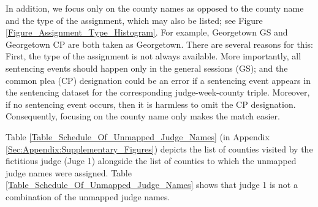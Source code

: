 \documentclass[11pt]{article}
\theoremstyle{ModifiedStyle}
\begin{document}
  	In addition, we focus only on the county names as opposed to the county name and the type of the assignment, which may also be listed; see Figure \ref{Figure_Assignment_Type_Histogram}. For example, Georgetown GS and Georgetown CP are both taken as Georgetown. There are several reasons for this: First, the type of the assignment is not always available. More importantly, all sentencing events should happen only in the general sessions (GS); and the common plea (CP) designation could be an error if a sentencing event appears in the sentencing dataset for the corresponding judge-week-county triple. Moreover, if no sentencing event occurs, then it is harmless to omit the CP designation. Consequently, focusing on the county name only makes the match easier.

  	Table \ref{Table_Schedule_Of_Unmapped_Judge_Names} (in Appendix \ref{Sec:Appendix:Supplementary_Figures}) depicts the list of counties visited by the fictitious judge (Juge 1) alongside the list of counties to which the unmapped judge names were assigned. Table \ref{Table_Schedule_Of_Unmapped_Judge_Names} shows that judge 1 is not a combination of the unmapped judge names.
\end{document}

